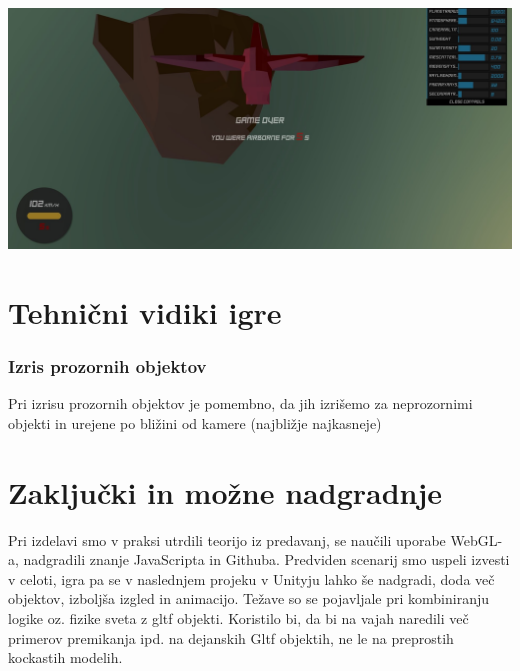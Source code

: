 \documentclass[a4paper]{article}
\begin{document}
\begin{center}
     \includegraphics[width=\columnwidth]{game over.jpg}
\end{center}

\section{Tehnični vidiki igre} %
\subsubsection{Izris prozornih objektov}%
Pri izrisu prozornih objektov je pomembno, da jih izrišemo za neprozornimi objekti in urejene po bližini od kamere (najbližje najkasneje)

\section{Zaključki in možne nadgradnje} %
Pri izdelavi smo v praksi utrdili teorijo iz predavanj, se naučili uporabe WebGL-a, nadgradili znanje JavaScripta in Githuba. Predviden scenarij smo uspeli izvesti v celoti, igra pa se v naslednjem projeku v Unityju lahko še nadgradi, doda več objektov, izboljša izgled in animacijo. Težave so se pojavljale pri kombiniranju logike oz. fizike sveta z gltf objekti. Koristilo bi, da bi na vajah naredili več primerov premikanja ipd. na dejanskih Gltf objektih, ne le na preprostih kockastih modelih.

\small

%
\end{document}

